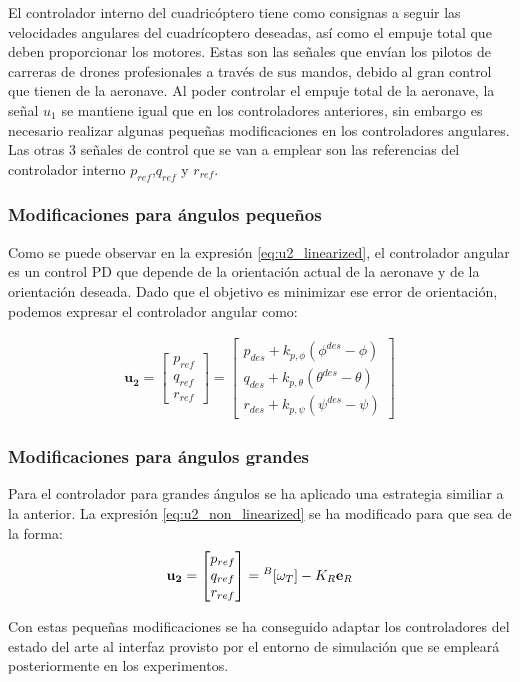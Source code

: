 El controlador interno del cuadricóptero tiene como consignas a seguir las velocidades angulares del cuadrícoptero deseadas, así como el empuje total que deben proporcionar los motores. Estas son las señales que envían los pilotos de carreras de drones profesionales a través de sus mandos, debido al gran control que tienen de la aeronave. Al poder controlar el empuje total de la aeronave, la señal $u_1$ se mantiene igual que en los controladores anteriores, sin embargo es necesario realizar algunas pequeñas modificaciones en los controladores angulares. Las otras 3 señales de control que se van a emplear son las referencias del controlador interno $p_{ref}$,$q_{ref}$ y $r_{ref}$.

\subsubsection{Modificaciones para ángulos pequeños}
Como se puede observar en la expresión \ref{eq:u2_linearized},  el controlador angular es un control PD que depende de la orientación actual de la aeronave y de la orientación deseada. Dado que el objetivo es minimizar ese error de orientación, podemos expresar el controlador angular como:

\begin{align}
	\mathbf{u_2} =
	\begin{bmatrix}
		p_{ref} \\
		q_{ref} \\
		r_{ref} 
	\end{bmatrix}=
	\begin{bmatrix}
		p_{des} + k_{p,\phi}(\phi^{des}-\phi)\\
		q_{des} + k_{p,\theta}(\theta^{des}-\theta)\\
		r_{des} + k_{p,\psi}(\psi^{des}-\psi)
		\end{bmatrix}
\end{align}


\subsubsection{Modificaciones para ángulos grandes}
Para el controlador para grandes ángulos se ha aplicado una estrategia similiar a la anterior. La expresión \ref{eq:u2_non_linearized} se ha modificado para que sea de la forma:
\begin{equation}
	\mathbf{u_2}=
	\begin{bmatrix}
		p_{ref}\\
		q_{ref}\\
		r_{ref}
	\end{bmatrix}=  \null^B[\omega_T]    -K_R	\mathbf{e}_R  
\end{equation}

Con estas pequeñas modificaciones se ha conseguido adaptar los controladores del estado del arte al interfaz provisto por el entorno de simulación que se empleará posteriormente en los experimentos.


